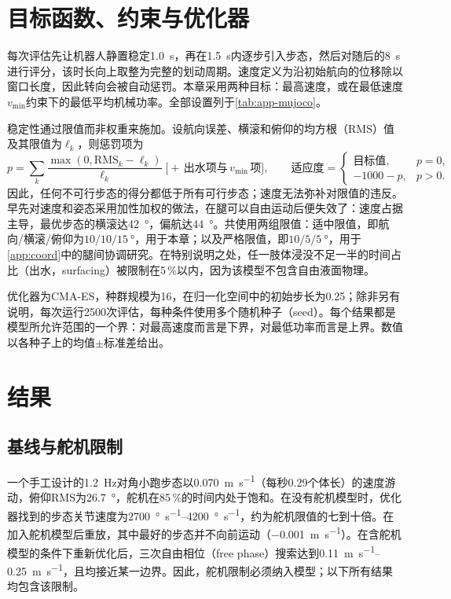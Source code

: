 \section{目标函数、约束与优化器}
\label{sec:mj-objective}

每次评估先让机器人静置稳定\SI{1.0}{\second}，再在\SI{1.5}{\second}内逐步引入步态，然后对随后的\SI{8}{\second}进行评分，该时长向上取整为完整的划动周期。速度定义为沿初始航向的位移除以窗口长度，因此转向会被自动惩罚。本章采用两种目标：最高速度，或在最低速度$v_\text{min}$约束下的最低平均机械功率。全部设置列于\cref{tab:app-mujoco}。

稳定性通过限值而非权重来施加。设航向误差、横滚和俯仰的均方根（RMS）值及其限值为$\ell_k$，则惩罚项为
\begin{equation}
  p = \sum_k \frac{\max(0,\mathrm{RMS}_k-\ell_k)}{\ell_k}
    \;\big[+\,\text{出水项与}\,v_\text{min}\,\text{项}\big], \qquad
  \text{适应度} = \begin{cases} \text{目标值}, & p=0,\\ -1000-p, & p>0. \end{cases}
  \label{eq:feasibility}
\end{equation}
因此，任何不可行步态的得分都低于所有可行步态；速度无法弥补对限值的违反。早先对速度和姿态采用加性加权的做法，在腿可以自由运动后便失效了：速度占据主导，最优步态的横滚达\SI{42}{\degree}，偏航达\SI{44}{\degree}。共使用两组限值：适中限值，即航向/横滚/俯仰为$10/10/\SI{15}{\degree}$，用于本章；以及严格限值，即$10/5/\SI{5}{\degree}$，用于\cref{app:coord}中的腿间协调研究。在特别说明之处，任一肢体浸没不足一半的时间占比（出水，surfacing）被限制在5\,\%以内，因为该模型不包含自由液面物理。

优化器为CMA-ES，种群规模为16，在归一化空间中的初始步长为0.25；除非另有说明，每次运行2500次评估，每种条件使用多个随机种子（seed）。每个结果都是模型所允许范围的一个界：对最高速度而言是下界，对最低功率而言是上界。数值以各种子上的均值$\pm$标准差给出。

\section{结果}
\label{sec:mj-results}

\subsection{基线与舵机限制}

一个手工设计的\SI{1.2}{\hertz}对角小跑步态以\SI{0.070}{\metre\per\second}（每秒0.29个体长）的速度游动，俯仰RMS为\SI{26.7}{\degree}，舵机在85\,\%的时间内处于饱和。在没有舵机模型时，优化器找到的步态关节速度为\SIrange{2700}{4200}{\degree\per\second}，约为舵机限值的七到十倍。在加入舵机模型后重放，其中最好的步态并不向前运动（\SI{-0.001}{\metre\per\second}）。在含舵机模型的条件下重新优化后，三次自由相位（free phase）搜索达到\SIrange{0.11}{0.25}{\metre\per\second}，且均接近某一边界。因此，舵机限制必须纳入模型；以下所有结果均包含该限制。

